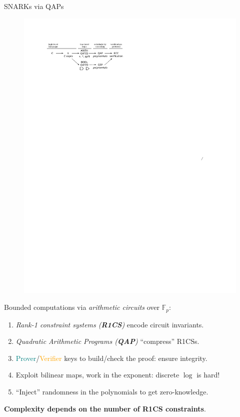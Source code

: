 \documentclass[beamer={10pt,xcolor=dvipsnames},target=mst]{thud}
\begin{document}
\begin{frame}{SNARKs via QAPs~\cite{GennaroGPR2012,ParnoGHR2013,Groth2016}}
  \begin{figure}
    \centering
      \includegraphics{res/pinocchio.pdf}
  \end{figure}
  \vspace*{16pt}
  Bounded computations via \emph{arithmetic circuits} over \(\mathbb{F}_p\):
  \begin{enumerate}
    \item \emph{Rank-1 constraint systems (\textbf{R1CS})} encode circuit invariants.
    \item \emph{Quadratic Arithmetic Programs (\textbf{QAP})} ``compress'' R1CSs.
    \item \textcolor{teal}{Prover}/\textcolor{orange}{Verifier} keys to build/check the proof: ensure integrity.
    \item Exploit bilinear maps, work in the exponent: discrete \(\log \) is hard!
    \item ``Inject'' randomness in the polynomials to get zero-knowledge.
  \end{enumerate}
  \vspace*{16pt}
  \textbf{Complexity depends on the number of R1CS constraints}.
\end{frame}
\end{document}
